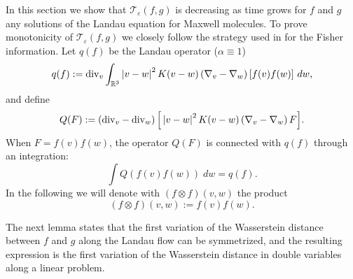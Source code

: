 \documentclass[11pt]{amsart}
\numberwithin{equation}{section}
\begin{document}
 In this section we show  that $\mathcal T_\varepsilon(f,g)$ is decreasing as time grows  for $f$ and $g$ any solutions of the Landau equation for Maxwell molecules.
To prove monotonicity of $\mathcal T_\varepsilon(f,g)$ we closely follow the strategy used in \cite{GS24} for the Fisher information. 
Let $q(f)$ be the Landau operator ($\alpha \equiv 1$)
% 
\begin{equation}\label{eq:Landau_MM}
   q(f):=\textnormal{div}_{v}\int_{\mathbb{R}^{3}}\left|v-w\right|^{2}K(v-w)\left(\nabla_{v}-\nabla_{w}\right)\left[f(v)f(w)\right]\,dw,
\end{equation}
% 
% 
and define 
\begin{equation}\label{eq:defn_Q}
  Q(F):=\left(\textnormal{div}_{v}-\textnormal{div}_{w}\right)\Big[\left|v-w\right|^{2}K(v-w)\left(\nabla_{v}-\nabla_{w}\right)F\Big].
\end{equation}
% 
When $F = f(v) f(w)$, the operator $Q(F)$ is connected with $q(f) $ through an integration:
\[
\int Q(f(v)f(w)) \;dw =q(f).%
\]
In the following we will denote with $(f\otimes f)(v,w)$ the product 
$$
(f\otimes f)(v,w):=f(v)f(w).
$$




The next lemma states that the first variation of the Wasserstein distance between $f$ and $g$ along the Landau flow can be symmetrized, and the resulting expression is the first variation of the Wasserstein distance in double variables along a linear problem.
\end{document}
